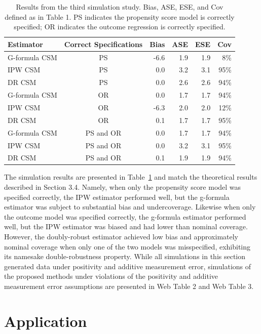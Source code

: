 \documentclass[useAMS,usenatbib,referee]{biom}
\begin{document}
\begin{table}[]
    \centering
    \caption{Results from the third simulation study. Bias, ASE, ESE, and Cov defined as in Table 1. PS indicates the propensity score model is correctly specified; OR indicates the outcome regression is correctly specified.}
    \begin{tabular}{lcrrrr}
    \hline
         Estimator & Correct Specifications & Bias & ASE & ESE & Cov \\
         \hline
G-formula CSM & PS & -6.6 & 1.9 & 1.9 & 8\% \\
IPW CSM & PS & 0.0 & 3.2 & 3.1 & 95\% \\
DR CSM & PS & 0.0 & 2.6 & 2.6 & 94\% \\[4pt]
G-formula CSM & OR & 0.0 & 1.7 & 1.7 & 94\% \\
IPW CSM & OR & -6.3 & 2.0 & 2.0 & 12\% \\
DR CSM & OR & 0.1 & 1.7 & 1.7 & 95\% \\[4pt]
G-formula CSM & PS and OR & 0.0 & 1.7 & 1.7 & 94\% \\
IPW CSM & PS and OR & 0.0 & 3.2 & 3.1 & 95\% \\
DR CSM & PS and OR & 0.1 & 1.9 & 1.9 & 94\% \\
         \hline
    \end{tabular}
    \label{tab:three}
\end{table}

The simulation results are presented in Table~\ref{tab:three} and match the theoretical results described in Section 3.4. Namely, when only the propensity score model was specified correctly, the IPW estimator performed well, but the g-formula estimator was subject to substantial bias and undercoverage. Likewise when only the outcome model was specified correctly, the g-formula estimator performed well, but the IPW estimator was biased and had lower than nominal coverage. However, the doubly-robust estimator achieved low bias and approximately nominal coverage when only one of the two models was misspecified, exhibiting its namesake double-robustness property. While all simulations in this section generated data under positivity and additive measurement error, simulations of the proposed methods under violations of the positivity and additive measurement error assumptions are presented in Web Table 2 and Web Table 3.

\section{Application}
\end{document}
